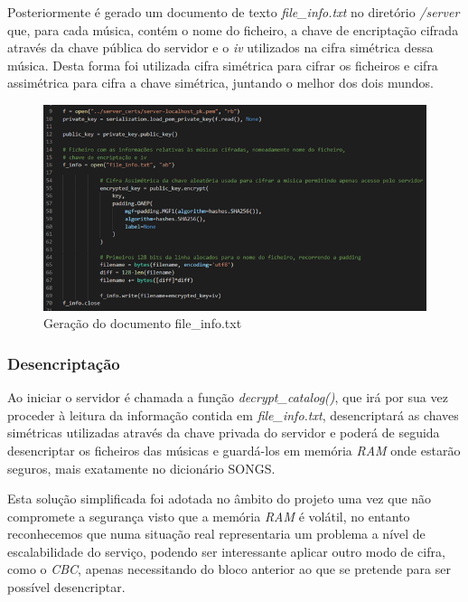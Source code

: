 \documentclass[10pt,english]{article}
\begin{document}
\par Posteriormente é gerado um documento de texto \textit{file\_info.txt} no diretório \textit{/server} que, para cada música, contém o nome do ficheiro, a chave de encriptação cifrada através da chave pública do servidor e o \textit{iv} utilizados na cifra simétrica dessa música. Desta forma foi utilizada cifra simétrica para cifrar os ficheiros e cifra assimétrica para cifra a chave simétrica, juntando o melhor dos dois mundos.

\begin{figure}[!h]
        \centering
        \includegraphics[width=500]{images/Geração de file info.png}
        \caption{Geração do documento file\_info.txt }
\end{figure}

\subsubsection{Desencriptação}
\par Ao iniciar o servidor é chamada a função \textit{decrypt\_catalog()}, que irá por sua vez proceder à leitura da informação contida em \textit{file\_info.txt}, desencriptará as chaves simétricas utilizadas através da chave privada do servidor e poderá de seguida desencriptar os ficheiros das músicas e guardá-los em memória \textit{RAM} onde estarão seguros, mais exatamente no dicionário SONGS.
\par Esta solução simplificada foi adotada no âmbito do projeto uma vez que não compromete a segurança visto que a memória \textit{RAM} é volátil, no entanto reconhecemos que numa situação real representaria um problema a nível de escalabilidade do serviço, podendo ser interessante aplicar outro modo de cifra, como o \textit{CBC}, apenas necessitando do bloco anterior ao que se pretende para ser possível desencriptar.
\end{document}
